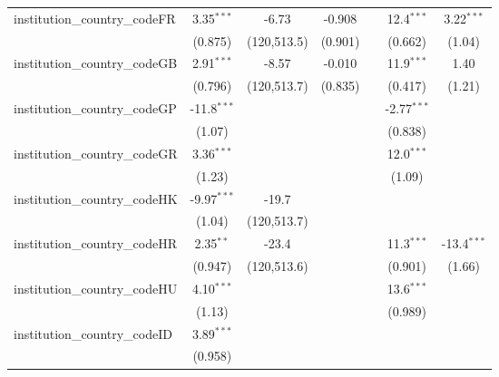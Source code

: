 \begin{tabular}{lcccccc}
   institution\_country\_codeFR          & 3.35$^{***}$   & -6.73         & -0.908        &            & 12.4$^{***}$  & 3.22$^{***}$\\   
                                         & (0.875)        & (120,513.5)   & (0.901)       &            & (0.662)       & (1.04)\\   
   institution\_country\_codeGB          & 2.91$^{***}$   & -8.57         & -0.010        &            & 11.9$^{***}$  & 1.40\\   
                                         & (0.796)        & (120,513.7)   & (0.835)       &            & (0.417)       & (1.21)\\   
   institution\_country\_codeGP          & -11.8$^{***}$  &               &               &            & -2.77$^{***}$ &   \\   
                                         & (1.07)         &               &               &            & (0.838)       &   \\   
   institution\_country\_codeGR          & 3.36$^{***}$   &               &               &            & 12.0$^{***}$  &   \\   
                                         & (1.23)         &               &               &            & (1.09)        &   \\   
   institution\_country\_codeHK          & -9.97$^{***}$  & -19.7         &               &            &               &   \\   
                                         & (1.04)         & (120,513.7)   &               &            &               &   \\   
   institution\_country\_codeHR          & 2.35$^{**}$    & -23.4         &               &            & 11.3$^{***}$  & -13.4$^{***}$\\   
                                         & (0.947)        & (120,513.6)   &               &            & (0.901)       & (1.66)\\   
   institution\_country\_codeHU          & 4.10$^{***}$   &               &               &            & 13.6$^{***}$  &   \\   
                                         & (1.13)         &               &               &            & (0.989)       &   \\   
   institution\_country\_codeID          & 3.89$^{***}$   &               &               &            &               &   \\   
                                         & (0.958)        &               &               &            &               &   \\   

\end{tabular}
